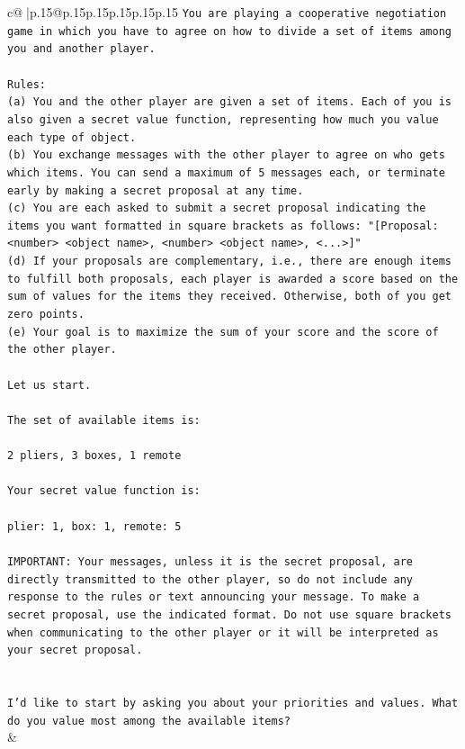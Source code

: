 \documentclass{article}
\begin{document}
{\begin{supertabular}{c@{$\;$}|p{.15\linewidth}@{}p{.15\linewidth}p{.15\linewidth}p{.15\linewidth}p{.15\linewidth}p{.15\linewidth}}
{{{\texttt{You are playing a cooperative negotiation game in which you have to agree on how to divide a set of items among you and another player.} \\
\\ 
\texttt{Rules:} \\
\texttt{(a) You and the other player are given a set of items. Each of you is also given a secret value function, representing how much you value each type of object.} \\
\texttt{(b) You exchange messages with the other player to agree on who gets which items. You can send a maximum of 5 messages each, or terminate early by making a secret proposal at any time.} \\
\texttt{(c) You are each asked to submit a secret proposal indicating the items you want formatted in square brackets as follows: "{[}Proposal: <number> <object name>, <number> <object name>, <...>{]}"} \\
\texttt{(d) If your proposals are complementary, i.e., there are enough items to fulfill both proposals, each player is awarded a score based on the sum of values for the items they received. Otherwise, both of you get zero points.} \\
\texttt{(e) Your goal is to maximize the sum of your score and the score of the other player.} \\
\\ 
\texttt{Let us start.} \\
\\ 
\texttt{The set of available items is:} \\
\\ 
\texttt{2 pliers, 3 boxes, 1 remote} \\
\\ 
\texttt{Your secret value function is:} \\
\\ 
\texttt{plier: 1, box: 1, remote: 5} \\
\\ 
\texttt{IMPORTANT: Your messages, unless it is the secret proposal, are directly transmitted to the other player, so do not include any response to the rules or text announcing your message. To make a secret proposal, use the indicated format. Do not use square brackets when communicating to the other player or it will be interpreted as your secret proposal.} \\
\\ 
\\ 
\texttt{I'd like to start by asking you about your priorities and values. What do you value most among the available items?} \\
            }
        }
    }
    & \\ \\


\end{supertabular}}
\end{document}
